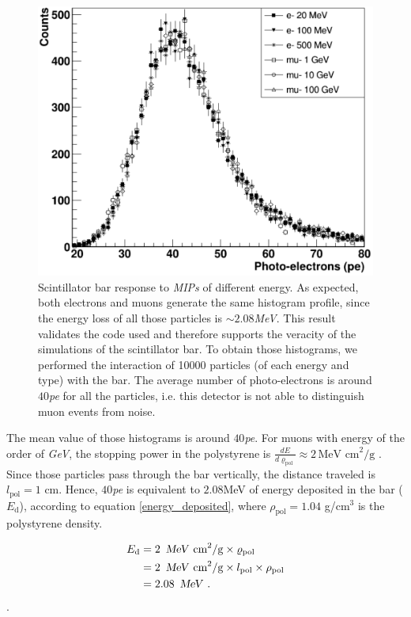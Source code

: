 \documentclass[submitting]{nst}
\begin{document}
\begin{figure}
    \centering
    \includegraphics[scale=0.24]{Figures/MIPS.png}
    \caption{Scintillator bar response to \textsl{MIPs} of different energy. As expected, both electrons and muons generate the same histogram profile, since the energy loss of all those particles is $\sim 2.08$\textsl{MeV}. This result validates the code used and therefore supports the veracity of the simulations of the scintillator bar.
    To obtain those histograms, we performed the interaction of 10000 particles (of each energy and type) with the bar. The average number of photo-electrons is around $40$\textsl{pe} for all the particles, i.e. this detector is not able to distinguish muon events from noise.}
    \label{fig:mips}
\end{figure}

The mean value of those histograms is around $40$\textsl{pe}. For muons with energy of the order of \textsl{GeV}, the stopping power in the polystyrene is $\frac{dE}{d\varrho_\mathrm{pol}}\approx 2 \,\text{MeV cm}^2\text{/g}$ \cite{MichaelEtal2008}. Since those particles pass through the bar vertically, the distance traveled is $l_\mathrm{pol}=1$ cm. Hence, $40$\textsl{pe} is equivalent to $2.08$MeV of energy deposited in the bar ($E_\mathrm{d}$), according to equation \ref{energy_deposited}, where $\rho_\mathrm{pol}=1.04$ g/cm$^3$ is the polystyrene density. 

\begin{equation}
\label{energy_deposited}
\begin{split}
    E_\mathrm{d} &= 2 \,\text{  \textsl{MeV}  cm}^2\text{/g} \times \varrho_\mathrm{pol} \\
    &= 2 \,\text{  \textsl{MeV}  cm}^2\text{/g} \times l_\mathrm{pol} \times \rho_\mathrm{pol}\\
    &= \text{2.08} \, \text{  \textsl{MeV} }.
\end{split}
\end{equation}.
\end{document}
